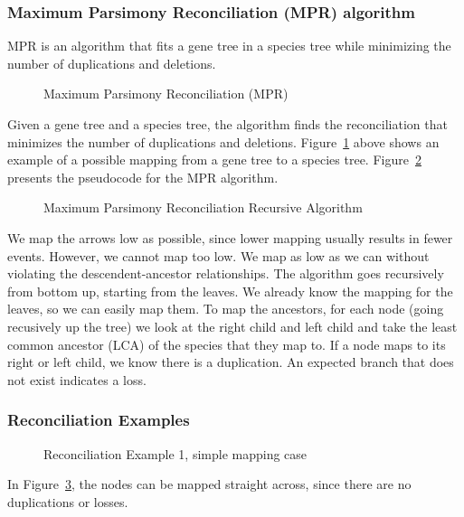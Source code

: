 \subsubsection{Maximum Parsimony Reconciliation (MPR) algorithm}
MPR is an algorithm that fits a gene tree in a species tree while minimizing the number of duplications and deletions.
\begin{figure}[H]
  \centering
  \caption{Maximum Parsimony Reconciliation (MPR) } 
  \label{Fig08_MaximumParsimonyReconciliation}
\end{figure}

\noindent Given a gene tree and a species tree, the algorithm finds the reconciliation that minimizes the number of duplications and deletions. Figure~\ref{Fig08_MaximumParsimonyReconciliation} above shows an example of a possible mapping from a gene tree to a species tree. Figure~\ref{Fig09_MPRAlgorithm} presents the pseudocode for the MPR algorithm.

\begin{figure}[H]
  \centering
  \caption{Maximum Parsimony Reconciliation Recursive Algorithm} 
  \label{Fig09_MPRAlgorithm}
\end{figure}

\noindent We map the arrows low as possible, since lower mapping usually results in fewer events. However, we cannot map too low. We map as low as we can without violating the descendent-ancestor relationships. The algorithm goes recursively from bottom up, starting from the leaves. We already know the mapping for the leaves, so we can easily map them. To map the ancestors, for each node (going recusively up the tree) we look at the right child and left child and take the least common ancestor (LCA) of the species that they map to. If a node maps to its right or left child, we know there is a duplication. An expected branch that does not exist indicates a loss.   

\subsubsection{Reconciliation Examples}

\begin{figure}[H]
  \centering
  \caption{Reconciliation Example 1, simple mapping case} 
  \label{ReconciliationExample1}
\end{figure}
In Figure~\ref{ReconciliationExample1}, the nodes can be mapped straight across, since there are no duplications or losses.

